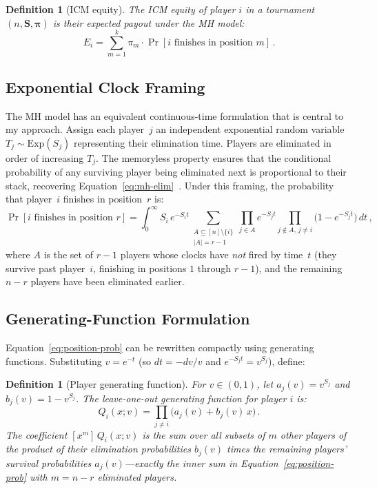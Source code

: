 \documentclass[11pt]{article}
\newtheorem{definition}[theorem]{Definition}
\begin{document}
\begin{definition}[ICM equity]
The \emph{ICM equity} of player $i$ in a tournament $(n, \bm{S},
\bm{\pi})$ is their expected payout under the MH model:
\begin{equation}\label{eq:icm-equity}
  E_i = \sum_{m=1}^{k} \pi_m \cdot \Pr[i \text{ finishes in position } m]\,.
\end{equation}
\end{definition}

\subsection{Exponential Clock Framing}

The MH model has an equivalent continuous-time formulation that is central
to my approach. Assign each player~$j$ an independent exponential random
variable $T_j \sim \mathrm{Exp}(S_j)$ representing their elimination time.
Players are eliminated in order of increasing $T_j$. The memoryless
property ensures that the conditional probability of any surviving player
being eliminated next is proportional to their stack, recovering
Equation~\ref{eq:mh-elim}~\citep{harville1973}. Under this framing, the
probability that player~$i$ finishes in position~$r$ is:
\begin{equation}\label{eq:position-prob}
  \Pr[i \text{ finishes in position } r]
  = \int_0^\infty S_i \, e^{-S_i t}
    \!\!\!\sum_{\substack{A \subseteq [n] \setminus \{i\} \\ |A| = r-1}}
    \prod_{j \in A} e^{-S_j t}
    \prod_{j \notin A,\, j \neq i} \!\bigl(1 - e^{-S_j t}\bigr)\, dt\,,
\end{equation}
where $A$ is the set of $r-1$ players whose clocks have \emph{not} fired
by time~$t$ (they survive past player~$i$, finishing in positions $1$
through $r-1$), and the remaining $n-r$ players have been eliminated
earlier.

\subsection{Generating-Function Formulation}

Equation~\ref{eq:position-prob} can be rewritten compactly using generating
functions. Substituting $v = e^{-t}$ (so $dt = -dv/v$ and
$e^{-S_j t} = v^{S_j}$), define:

\begin{definition}[Player generating function]
For $v \in (0, 1)$, let $a_j(v) = v^{S_j}$ and
$b_j(v) = 1 - v^{S_j}$. The \emph{leave-one-out generating function} for
player $i$ is:
\begin{equation}\label{eq:gen-func}
  Q_i(x; v) = \prod_{j \neq i} \bigl(a_j(v) + b_j(v) \, x\bigr)\,.
\end{equation}
The coefficient $[x^m]\, Q_i(x; v)$ is the sum over all subsets of $m$
other players of the product of their elimination probabilities $b_j(v)$
times the remaining players' survival probabilities $a_j(v)$---exactly the
inner sum in Equation~\ref{eq:position-prob} with $m = n - r$ eliminated
players.
\end{definition}
\end{document}
